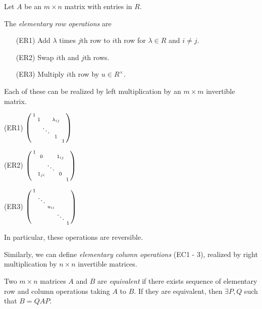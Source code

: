 Let \(A\) be an \(m \times n\) matrix with entries in \(R\).
\begin{definition}{}{}
    The \textit{elementary row operations} are
    \begin{enumerate}
        \item[(ER1)] Add \(\lambda\) times \(j\)th row to \(i\)th row for \(\lambda \in R\) and \(i \neq j\).
        \item[(ER2)] Swap \(i\)th and \(j\)th rows.
        \item[(ER3)] Multiply \(i\)th row by \(u \in R^\times\).
    \end{enumerate}
    Each of these can be realized by left multiplication by an \(m \times m\) invertible matrix.
    
    \begin{enumerate*}
        \item[(ER1)] \(\begin{psmallmatrix}
            1 &  &  &  &   \\
             & 1 &  & \lambda_{ij} &   \\
             &  & \ddots & &   \\
             &  &  & 1 &   \\
             &  &  &  & 1  \\
        \end{psmallmatrix}\)
        \item[(ER2)] \(\begin{psmallmatrix}
            1 &  &  &  &   \\
             & 0 &  & 1_{ij} &   \\
             &  & \ddots &  &   \\
             & 1_{ji} &  & 0 &   \\
             &  &  &  &  1 \\
        \end{psmallmatrix}\)
        \item[(ER3)] \(\begin{psmallmatrix}
            1 &  &  &  &   \\
             & \ddots &  &  &   \\
             &  & u_{ii} &  &   \\
             &  &  & \ddots &   \\
             &  &  &  &  1 \\
        \end{psmallmatrix}\)
    \end{enumerate*}

    In particular, these operations are reversible.

    Similarly, we can define \textit{elementary column operations} (EC1 - 3), realized by right multiplication by \(n \times n\) invertible matrices.
\end{definition}
\begin{definition}{}{}
    Two \(m \times n\) matrices \(A\) and \(B\) are \textit{equivalent} if there exists sequence of elementary row and column operations taking \(A\) to \(B\). If they are equivalent, then \(\exists P, Q\) such that \(B = QAP\).
\end{definition}